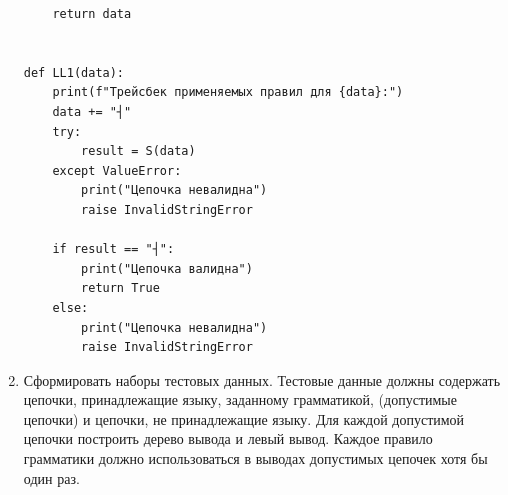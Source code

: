 \documentclass[a4paper,14pt]{extarticle}
\begin{document}
\begin{enumerate}[1.]
\begin{verbatim}
    return data


def LL1(data):
    print(f"Трейсбек применяемых правил для {data}:")
    data += "┤"
    try:
        result = S(data)
    except ValueError:
        print("Цепочка невалидна")
        raise InvalidStringError

    if result == "┤":
        print("Цепочка валидна")
        return True
    else:
        print("Цепочка невалидна")
        raise InvalidStringError
    \end{verbatim}
    \item Сформировать наборы тестовых данных. Тестовые данные должны 
    содержать цепочки, принадлежащие языку, заданному грамматикой, 
    (допустимые цепочки) и цепочки, не принадлежащие языку. Для
    каждой допустимой цепочки построить дерево вывода и левый вывод.
    Каждое правило грамматики должно использоваться в выводах допустимых 
    цепочек хотя бы один раз.


\end{enumerate}
\end{document}
